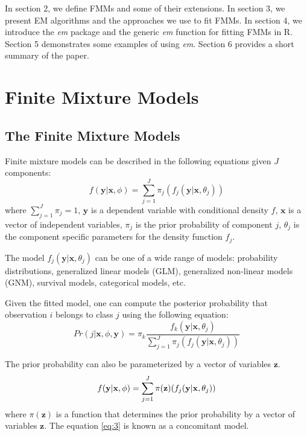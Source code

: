 \documentclass[nojss]{jss}
\begin{document}
In section 2, we define FMMs and some of their extensions. In section 3, we present EM algorithms and the approaches we use to fit FMMs. In section 4, we introduce the \emph{em} package and the generic \emph{em} function for fitting FMMs in R. Section 5 demonstrates some examples of using \emph{em}. Section 6 provides a short summary of the paper.   
   \section{Finite Mixture Models}
      \subsection{The Finite Mixture Models}
	      Finite mixture models can be described in the following equations given $J$ components:
      \begin{equation}
	      f(\mathbf{y}|\mathbf{x},\phi) = \sum_{j=1}^J \pi_j(f_j(\mathbf{y}|\mathbf{x}, \theta_j))
	    \end{equation}
	    where $\sum_{j=1}^J \pi_j = 1$,  $\mathbf{y}$ is a dependent variable with conditional density $f$,  $\mathbf{x}$ is a vector of independent variables, $\pi_j$ is the prior probability of component $j$,  $\theta_j$ is the component specific parameters for the density function $f_j$.

The model $f_j(\mathbf{y}|\mathbf{x}, \theta_j)$ can be one of a wide range of models: probability distributions, generalized linear models (GLM), generalized non-linear models (GNM),  survival models,  categorical models, etc. %

Given the fitted model, one can compute the posterior probability that observation $i$ belongs to class $j$ using the following equation:
\begin{equation}
    Pr(j|\mathbf{x}, \phi, \mathbf{y}) = \pi_k\frac{f_k(\mathbf{y}|\mathbf{x}, \theta_j)}{\sum_{j=1}^J \pi_j(f_j(\mathbf{y}|\mathbf{x}, \theta_j))}
\end{equation}

The prior probability can also be parameterized by a vector of variables $\mathbf{z}$.
    \begin{equation}
      f(\mathbf{y}|\mathbf{x},\phi) = \sum_{j=1}^J \pi(\mathbf{z})(f_j(\mathbf{y}|\mathbf{x}, \theta_j)) \\
      \label{eq:3}
    \end{equation}
where $\pi(\mathbf{z})$ is a function that determines the prior probability by a vector of variables $\mathbf{z}$. The equation \ref{eq:3} is known as a concomitant model.
\end{document}
